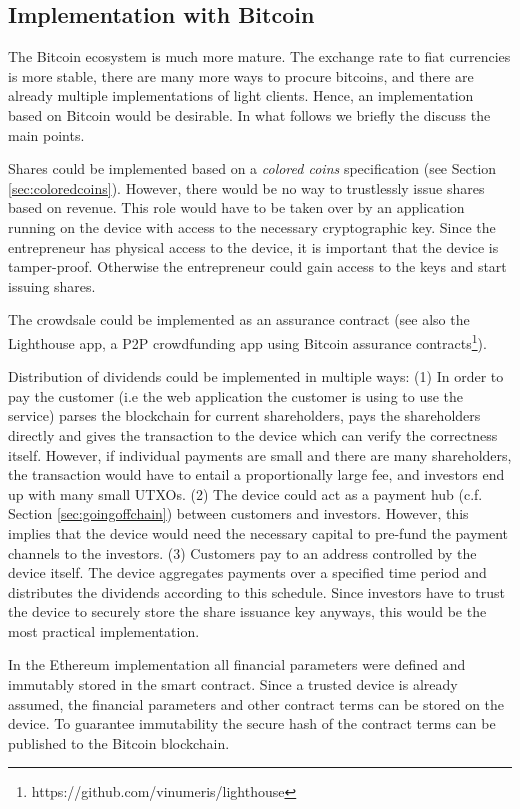 \subsection{Implementation with Bitcoin}

The Bitcoin ecosystem is much more mature. The exchange rate to fiat currencies is more stable, there are many more ways to procure bitcoins, and there are already multiple implementations of light clients. Hence, an implementation based on Bitcoin would be desirable. In what follows we briefly the discuss the main points.

Shares could be implemented based on a \emph{colored coins} specification (see Section \ref{sec:coloredcoins}). However, there would be no way to trustlessly issue shares based on revenue. This role would have to be taken over by an application running on the device with access to the necessary cryptographic key. Since the entrepreneur has physical access to the device, it is important that the device is tamper-proof. Otherwise the entrepreneur could gain access to the keys and start issuing shares.

The crowdsale could be implemented as an assurance contract \parencite{smartcontr} (see also the Lighthouse app, a \ac{P2P} crowdfunding app using Bitcoin assurance contracts\footnote{https://github.com/vinumeris/lighthouse}).

 Distribution of dividends could be implemented in multiple ways: (1) In order to pay the customer (i.e the web application the customer is using to use the service) parses the blockchain for current shareholders, pays the shareholders directly and gives the transaction to the device which can verify the correctness itself. However, if individual payments are small and there are many shareholders, the transaction would have to entail a proportionally large fee, and investors end up with many small \ac{UTXO}s. (2) The device could act as a payment hub (c.f. Section \ref{sec:goingoffchain}) between customers and investors. However, this implies that the device would need the necessary capital to pre-fund the payment channels to the investors. (3) Customers pay to an address controlled by the device itself. The device aggregates payments over a specified time period and distributes the dividends according to this schedule. Since investors have to trust the device to securely store the share issuance key anyways, this would be the most practical implementation. 

In the Ethereum implementation all financial parameters were defined and immutably stored in the smart contract. Since a trusted device is already assumed, the financial parameters and other contract terms can be stored on the device. To guarantee immutability the secure hash of the contract terms can be published to the Bitcoin blockchain. 

